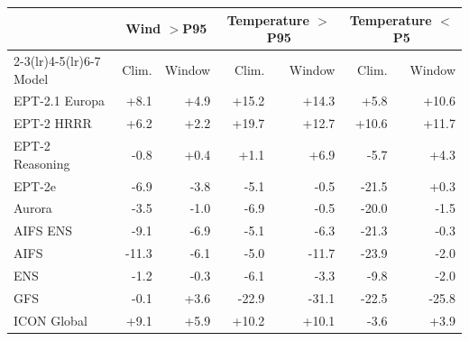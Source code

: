 \begin{tabular}{@{}lrrrrrr@{}}
\toprule
 & \multicolumn{2}{c}{Wind $>$P95} & \multicolumn{2}{c}{Temperature $>$P95} & \multicolumn{2}{c}{Temperature $<$P5} \\
\cmidrule(lr){2-3}\cmidrule(lr){4-5}\cmidrule(lr){6-7}
Model & Clim. & Window & Clim. & Window & Clim. & Window \\
\midrule
EPT-2.1 Europa & +8.1 & +4.9 & +15.2 & +14.3 & +5.8 & +10.6 \\
EPT-2 HRRR & +6.2 & +2.2 & +19.7 & +12.7 & +10.6 & +11.7 \\
EPT-2 Reasoning & -0.8 & +0.4 & +1.1 & +6.9 & -5.7 & +4.3 \\
EPT-2e & -6.9 & -3.8 & -5.1 & -0.5 & -21.5 & +0.3 \\
Aurora & -3.5 & -1.0 & -6.9 & -0.5 & -20.0 & -1.5 \\
AIFS ENS & -9.1 & -6.9 & -5.1 & -6.3 & -21.3 & -0.3 \\
AIFS & -11.3 & -6.1 & -5.0 & -11.7 & -23.9 & -2.0 \\
ENS & -1.2 & -0.3 & -6.1 & -3.3 & -9.8 & -2.0 \\
GFS & -0.1 & +3.6 & -22.9 & -31.1 & -22.5 & -25.8 \\
ICON Global & +9.1 & +5.9 & +10.2 & +10.1 & -3.6 & +3.9 \\
\bottomrule
\end{tabular}
